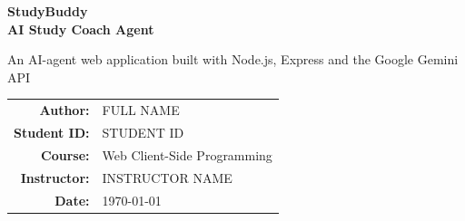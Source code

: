 \documentclass[11pt,a4paper]{article}
\newcommand{\studentname}{FULL NAME}
\newcommand{\studentid}{STUDENT ID}
\newcommand{\coursename}{Web Client-Side Programming}
\newcommand{\instructorname}{INSTRUCTOR NAME}
\newcommand{\appurl}{https://studybuddy-XXXX.vercel.app}
\newcommand{\repourl}{https://github.com/manganjokean/studybuddy}
\begin{document}
\begin{titlepage}
  \centering
  \vspace*{1.5cm}

  {\Huge\bfseries StudyBuddy\\[6pt]\large AI Study Coach Agent\par}

  \vspace{1.2cm}
  {\Large An AI-agent web application built with Node.js, Express and the Google Gemini API\par}

  \vspace{2.2cm}


  \vfill

  {\large
    \begin{tabular}{rl}
      \textbf{Author:}      & \studentname \\[2pt]
      \textbf{Student ID:}  & \studentid \\[2pt]
      \textbf{Course:}      & \coursename \\[2pt]
      \textbf{Instructor:}  & \instructorname \\[2pt]
      \textbf{Date:}        & \today \\
    \end{tabular}\par}

  \vspace{1cm}
\end{titlepage}
\end{document}
